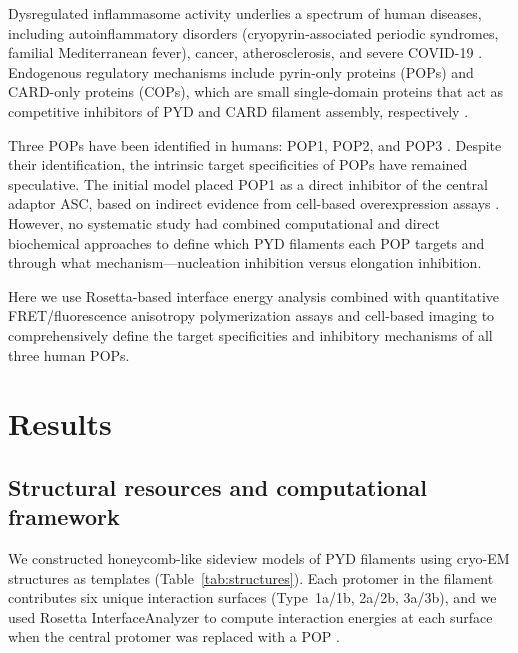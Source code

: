\documentclass[11pt,a4paper]{article}
\begin{document}
Dysregulated inflammasome activity underlies a spectrum of human diseases, including autoinflammatory disorders (cryopyrin-associated periodic syndromes, familial Mediterranean fever), cancer, atherosclerosis, and severe COVID-19 \citep{Dinarello2018, Swanson2019, Rodrigues2021}. Endogenous regulatory mechanisms include pyrin-only proteins (POPs) and CARD-only proteins (COPs), which are small single-domain proteins that act as competitive inhibitors of PYD and CARD filament assembly, respectively \citep{Stehlik2007, DeLaTorre2009, Khare2014}.

Three POPs have been identified in humans: POP1, POP2, and POP3 \citep{Stehlik2003, Dorfleutner2007, Khare2014}. Despite their identification, the intrinsic target specificities of POPs have remained speculative. The initial model placed POP1 as a direct inhibitor of the central adaptor ASC, based on indirect evidence from cell-based overexpression assays \citep{Stehlik2003}. However, no systematic study had combined computational and direct biochemical approaches to define which PYD filaments each POP targets and through what mechanism---nucleation inhibition versus elongation inhibition.

Here we use Rosetta-based interface energy analysis combined with quantitative FRET/fluorescence anisotropy polymerization assays and cell-based imaging to comprehensively define the target specificities and inhibitory mechanisms of all three human POPs.

\section{Results}

\subsection{Structural resources and computational framework}

We constructed honeycomb-like sideview models of PYD filaments using cryo-EM structures as templates (Table~\ref{tab:structures}). Each protomer in the filament contributes six unique interaction surfaces (Type~1a/1b, 2a/2b, 3a/3b), and we used Rosetta InterfaceAnalyzer to compute interaction energies at each surface when the central protomer was replaced with a POP \citep{Lyskov2013, Gray2003}.
\end{document}
